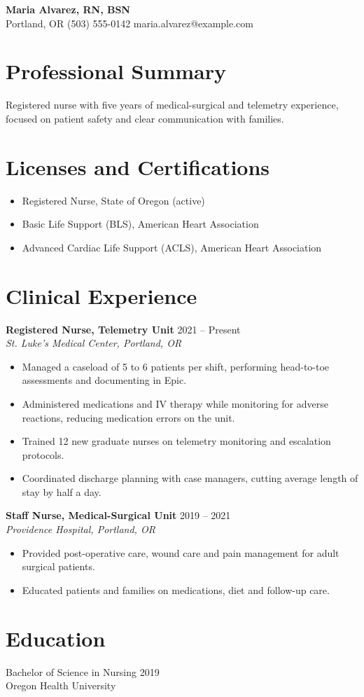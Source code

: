 \documentclass[11pt]{article}
\begin{document}
\begin{center}
{\LARGE \textbf{Maria Alvarez, RN, BSN}}\\
Portland, OR \quad (503) 555-0142 \quad maria.alvarez@example.com
\end{center}
\section*{Professional Summary}
Registered nurse with five years of medical-surgical and telemetry experience, focused on patient safety and clear communication with families.
\section*{Licenses and Certifications}
\begin{itemize}
\item Registered Nurse, State of Oregon (active)
\item Basic Life Support (BLS), American Heart Association
\item Advanced Cardiac Life Support (ACLS), American Heart Association
\end{itemize}
\section*{Clinical Experience}
\textbf{Registered Nurse, Telemetry Unit} \hfill 2021 -- Present\\
\textit{St. Luke's Medical Center, Portland, OR}
\begin{itemize}
\item Managed a caseload of 5 to 6 patients per shift, performing head-to-toe assessments and documenting in Epic.
\item Administered medications and IV therapy while monitoring for adverse reactions, reducing medication errors on the unit.
\item Trained 12 new graduate nurses on telemetry monitoring and escalation protocols.
\item Coordinated discharge planning with case managers, cutting average length of stay by half a day.
\end{itemize}
\textbf{Staff Nurse, Medical-Surgical Unit} \hfill 2019 -- 2021\\
\textit{Providence Hospital, Portland, OR}
\begin{itemize}
\item Provided post-operative care, wound care and pain management for adult surgical patients.
\item Educated patients and families on medications, diet and follow-up care.
\end{itemize}
\section*{Education}
Bachelor of Science in Nursing \hfill 2019\\
Oregon Health University
\end{document}
